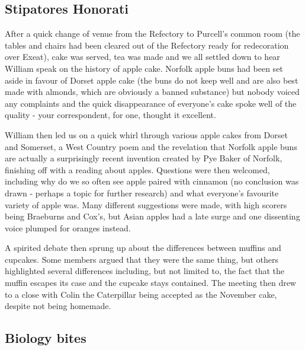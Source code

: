 \documentclass[11pt,a4paper]{report}
\begin{document}
\begin{multicols}{2}
\end{multicols}

\subsection{Stipatores Honorati}\label{stipatores-honorati}

\begin{multicols}{2}

After a quick change of venue from the Refectory to Purcell's common
room (the tables and chairs had been cleared out of the Refectory ready
for redecoration over Exeat), cake was served, tea was made and we all
settled down to hear William speak on the history of apple cake. Norfolk
apple buns had been set aside in favour of Dorset apple cake (the buns
do not keep well and are also best made with almonds, which are
obviously a banned substance) but nobody voiced any complaints and the
quick disappearance of everyone's cake spoke well of the quality - your
correspondent, for one, thought it excellent.

William then led us on a quick whirl through various apple cakes from
Dorset and Somerset, a West Country poem and the revelation that Norfolk
apple buns are actually a surprisingly recent invention created by Pye
Baker of Norfolk, finishing off with a reading about apples. Questions
were then welcomed, including why do we so often see apple paired with
cinnamon (no conclusion was drawn - perhaps a topic for further
research) and what everyone's favourite variety of apple was. Many
different suggestions were made, with high scorers being Braeburns and
Cox's, but Asian apples had a late surge and one dissenting voice
plumped for oranges instead.

A spirited debate then sprung up about the differences between muffins
and cupcakes. Some members argued that they were the same thing, but
others highlighted several differences including, but not limited to,
the fact that the muffin escapes its case and the cupcake stays
contained. The meeting then drew to a close with Colin the Caterpillar
being accepted as the November cake, despite not being homemade.

\end{multicols}

\subsection{Biology bites}\label{biology-bites}
\end{document}
